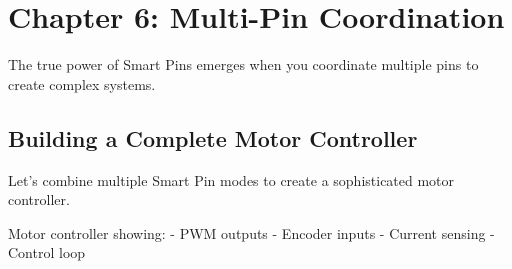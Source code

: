 \documentclass[11pt,a4paper,oneside,english]{book}
\begin{document}
\hypertarget{chapter-6-multi-pin-coordination}{%
\chapter{Chapter 6: Multi-Pin
Coordination}\label{chapter-6-multi-pin-coordination}}

The true power of Smart Pins emerges when you coordinate multiple pins
to create complex systems.

\hypertarget{building-a-complete-motor-controller}{%
\section{Building a Complete Motor
Controller}\label{building-a-complete-motor-controller}}

Let's combine multiple Smart Pin modes to create a sophisticated motor
controller.

Motor controller showing: - PWM outputs - Encoder inputs - Current
sensing - Control loop
\end{document}
